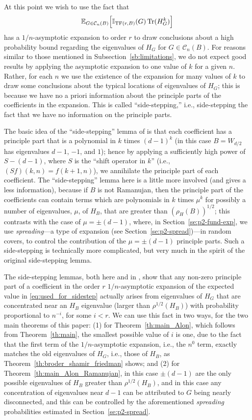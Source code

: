 \documentclass{memo-l}
\newcommand{\TF}{{\rm TF}}
\theoremstyle{plain}
\theoremstyle{definition}
\numberwithin{section}{chapter}
\numberwithin{equation}{chapter}
\newcommand{\rhoroot}[1]{\rho^{1/2}(H_{#1})}
\DeclareMathOperator{\Tr}{Tr}
\theoremstyle{plain}
\theoremstyle{definition}
\newcommand\EE{\mathbb{E}}
\newcommand\II{\mathbb{I}}
\newcommand\cC{\mathcal{C}}
\begin{document}
At this point we wish to use the fact that 
\begin{equation}\label{eq:used_for_sidestep}
\EE_{G\in\cC_n(B)} \Bigl[ \II_{\TF(r,B)}(G) \Tr(H_G^k) \Bigr]
\end{equation}
has a $1/n$-asymptotic expansion to order $r$ to draw conclusions about
a high probability bound regarding the eigenvalues of $H_G$ for
$G\in\cC_n(B)$.
For reasons similar to those mentioned in Subsection~\ref{sb:limitations},
we do not expect good results by applying the asymptotic expansion
to one value of $k$ for a given $n$.
Rather, for each $n$ we use the existence of the expansion for many
values of $k$ to draw some 
conclusions about the typical locations of eigenvalues of $H_G$;
this is because we have no a priori information about the principle
parts of the coefficients in the expansion.  This is called
``side-stepping,'' i.e., side-stepping the fact that we have no information
on the principle parts.

The basic idea of the ``side-stepping'' lemma of 
\cite{friedman_alon} is
that each coefficient has a principle part that is a polynomial in
$k$ times $(d-1)^k$ (in this case $B=W_{d/2}$ has eigenvalues $d-1$, $-1$,
and $1$); hence by applying a sufficiently high power
of $S-(d-1)$, where $S$ is the ``shift operator in $k$''
(i.e., $(Sf)(k,n)=f(k+1,n)$), we annihilate the principle part of 
each coefficient.  
The ``side-stepping'' lemma here is a little more involved (and gives
a less information), because if $B$ is not Ramanujan, then the
principle part of the coefficients can contain terms which are polynomials
in $k$ times $\mu^k$ for possibly a number of 
eigenvalues, $\mu$, of $H_B$, that 
are greater than $(\rho_H(B))^{1/2}$;
this contrasts with the case of $\mu=\pm(d-1)$,
where, in Section~\ref{se:p2-fund-exp}, we use {\em spreading}---a
type of expansion
(see Section~\ref{se:p2-spread})---in random covers, to control 
the contribution of the $\mu=\pm(d-1)$ principle parts.
Such a side-stepping is technically more complicated, but very much in
the spirit of the original side-stepping lemma.

The side-stepping lemmas, both here and in \cite{friedman_alon}, show
that any non-zero principle part of a coefficient in the order $r$
$1/n$-asymptotic expansion of the expected value 
in \eqref{eq:used_for_sidestep} actually arises from eigenvalues of
$H_G$ that are concentrated near an $H_B$ eigenvalue (larger than
$\rhoroot B$) with probability proportional to $n^{-i}$, for some $i<r$.
We can use this fact in two ways, for the two main theorems of this paper:
(1) for Theorem~\ref{th:main_Alon}, which follows from
Theorem~\ref{th:main}, the smallest possible value of $i$ is one,
due to the fact that the first term of the $1/n$-asymptotic expansion,
i.e., the $n^0$ term, 
exactly matches the old eigenvalues of $H_G$, i.e., those of $H_B$,
as Theorem~\ref{th:broder_shamir_friedman} shows; and
(2) for Theorem~\ref{th:main_Alon_Ramanujan}, in this case $\pm(d-1)$ are
the only possible
eigenvalues of $H_B$ greater than $\rhoroot B$, and in this case
any concentration of eigenvalues near $d-1$ can be attributed to $G$
being nearly disconnected, and this can be
controlled by the aforementioned {\em spreading}
probabilities estimated in Section~\ref{se:p2-spread}.
\end{document}
